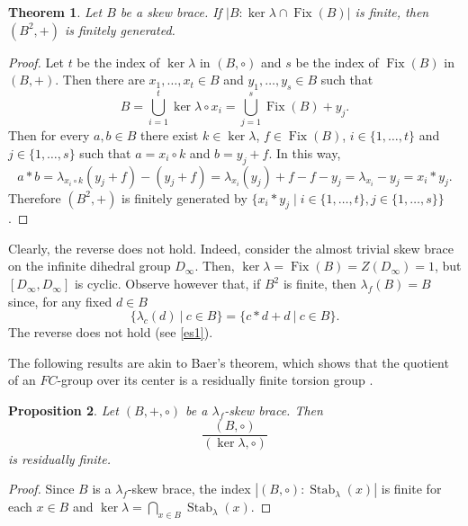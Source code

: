 \documentclass{amsart}
\newcommand{\Fix}{\operatorname{Fix}}
\newcommand{\Stab}{\operatorname{Stab}}
\newtheorem{thm}{Theorem}[section]
\newtheorem{pro}[thm]{Proposition}
\begin{document}
\begin{thm}
    Let $B$ be a skew brace.
    If $|B:\ker\lambda\cap\Fix(B)|$ is finite, then $(B^2,+)$ is finitely generated.
\end{thm}
\begin{proof}
    Let $t$ be the index of $\ker\lambda$ in $(B,\circ)$ and $s$ be the index of $\Fix(B)$ in $(B,+)$.
    Then there are $x_1,\dots,x_t\in B$ and $y_1,\dots, y_s\in B$ such that
    \[
    B=\bigcup_{i=1}^t \ker\lambda\circ x_i=\bigcup_{j=1}^s \Fix(B)+ y_j.
    \]
    Then for every $a,b\in B$ there exist $k\in \ker\lambda$, $f\in \Fix(B)$, $i\in\{1,\dots,t\}$ and $j\in\{1,\dots,s\}$ such that
    $a=x_i\circ k$ and $b=y_j+f$.
    In this way, 
    \[
    a * b = 
    \lambda_{x_i\circ k}(y_j+f)-(y_j+f)=
    \lambda_{x_i}(y_j)+f-f-y_j=
    \lambda_{x_i}-y_j=
    x_i*y_j.
    \]
    Therefore $(B^2,+)$ is finitely generated by 
    $\big\{x_i*y_j\mid i\in\{1,\dots,t\}, j\in\{1,\dots,s\} \big\}$.
\end{proof}
 
Clearly, the reverse does not hold. Indeed, consider the almost trivial skew brace on the infinite dihedral group $D_{\infty}$. Then, $\ker\lambda=\Fix(B)=Z(D_{\infty})=1$, but $[D_{\infty},D_{\infty}]$ is cyclic. Observe however that, if $B^2$ is finite, then $\lambda_f(B)=B$ since, for any fixed $d\in B$ $$\{\lambda_c(d)\ | \ c\in B\}=\{c*d+d\ | \ c\in B\}.$$ The reverse does not hold (see \cref{es1}).

The following results are akin to Baer's theorem, which shows that the quotient of an $FC$-group over its center is a residually finite torsion group \cite[Result 14.5.6]{robinson2}.
\begin{pro}
    Let $(B,+,\circ)$ be a $\lambda_f$-skew  brace. 
    Then 
    $$\frac{(B,\circ)}{(\ker\lambda,\circ)}$$
    is residually finite.
\end{pro}
\begin{proof}
    Since $B$ is a $\lambda_f$-skew brace, the index $|(B,\circ):\Stab_\lambda(x)|$ is finite for each $x\in B$ and $\ker\lambda=\bigcap_{x\in B}\Stab_\lambda(x)$. 
\end{proof}
\end{document}
